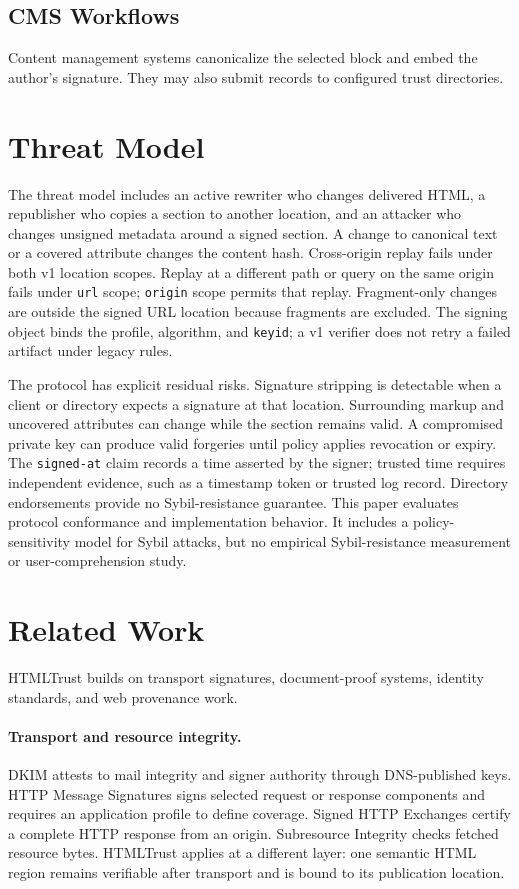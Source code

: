 \documentclass{article}
\begin{document}
\subsection{CMS Workflows}
Content management systems canonicalize the selected block and embed the
author's signature. They may also submit records to configured trust
directories.

\section{Threat Model}

The threat model includes an active rewriter who changes delivered HTML, a republisher who copies a section to another location, and an attacker who changes unsigned metadata around a signed section. A change to canonical text or a covered attribute changes the content hash. Cross-origin replay fails under both v1 location scopes. Replay at a different path or query on the same origin fails under \texttt{url} scope; \texttt{origin} scope permits that replay. Fragment-only changes are outside the signed URL location because fragments are excluded. The signing object binds the profile, algorithm, and \texttt{keyid}; a v1 verifier does not retry a failed artifact under legacy rules.

The protocol has explicit residual risks. Signature stripping is detectable when a client or directory expects a signature at that location. Surrounding markup and uncovered attributes can change while the section remains valid. A compromised private key can produce valid forgeries until policy applies revocation or expiry. The \texttt{signed-at} claim records a time asserted by the signer; trusted time requires independent evidence, such as a timestamp token or trusted log record. Directory endorsements provide no Sybil-resistance guarantee. This paper evaluates protocol conformance and implementation behavior. It includes a policy-sensitivity model for Sybil attacks, but no empirical Sybil-resistance measurement or user-comprehension study.

\section{Related Work}

HTMLTrust builds on transport signatures, document-proof systems, identity standards, and web provenance work.

\paragraph{Transport and resource integrity.} DKIM \cite{DKIM} attests to mail integrity and signer authority through DNS-published keys. HTTP Message Signatures \cite{HTTPMessageSignatures} signs selected request or response components and requires an application profile to define coverage. Signed HTTP Exchanges \cite{OriginSigned} certify a complete HTTP response from an origin. Subresource Integrity \cite{SRI} checks fetched resource bytes. HTMLTrust applies at a different layer: one semantic HTML region remains verifiable after transport and is bound to its publication location.
\end{document}

